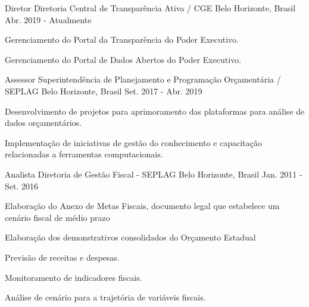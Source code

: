 \begin{cventries}
    \cventry
    {Diretor}
    {Diretoria Central de Transparência Ativa / CGE}
    {Belo Horizonte, Brasil}
    {Abr. 2019 - Atualmente}
    {
      \begin{cvitems}
        \item {Gerenciamento do Portal da Transparência do Poder Executivo.}
        \item {Gerenciamento do Portal de Dados Abertos do Poder Executivo.}
      \end{cvitems}
    }

    \cventry
    {Assessor}
    {Superintendência de Planejamento e Programação Orçamentária / SEPLAG}
    {Belo Horizonte, Brasil}
    {Set. 2017 - Abr. 2019}
    {
      \begin{cvitems}
        \item {Desenvolvimento de projetos para aprimoramento das plataformas para análise de dados orçamentários.}
        \item {Implementação de iniciativas de gestão do conhecimento e capacitação relacionadas a ferramentas computacionais.}
      \end{cvitems}
    }
    \cventry
    {Analista}
    {Diretoria de Gestão Fiscal - SEPLAG}
    {Belo Horizonte, Brasil}
    {Jan. 2011 - Set. 2016}
    {
      \begin{cvitems}
        \item {Elaboração do Anexo de Metas Fiscais, documento legal que estabelece um cenário fiscal de médio prazo}
        \item {Elaboração dos demonstrativos consolidados do Orçamento Estadual}
        \item {Previsão de receitas e despesas.}
        \item {Monitoramento de indicadores fiscais.}
        \item {Análise de cenário para a trajetória de variáveis fiscais.}
      \end{cvitems}
    }  
\end{cventries}

